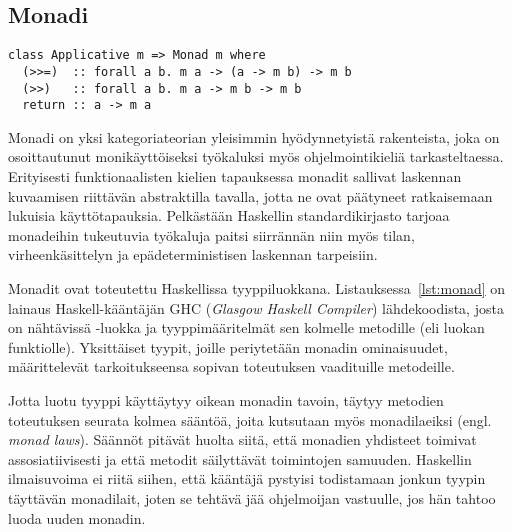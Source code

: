 \documentclass[finnish]{tktltiki2}
\begin{document}



\subsection{Monadi}

\begin{lstlisting}[float,float,label={lst:monad},caption={Monad-tyyppiluokka}]
class Applicative m => Monad m where
  (>>=)  :: forall a b. m a -> (a -> m b) -> m b
  (>>)   :: forall a b. m a -> m b -> m b
  return :: a -> m a
\end{lstlisting}

Monadi on yksi kategoriateorian yleisimmin hyödynnetyistä rakenteista, joka on osoittautunut
monikäyttöiseksi työkaluksi myös ohjelmointikieliä tarkasteltaessa. Erityisesti funktionaalisten
kielien tapauksessa monadit sallivat laskennan kuvaamisen riittävän abstraktilla tavalla, jotta ne
ovat päätyneet ratkaisemaan lukuisia käyttötapauksia. Pelkästään Haskellin standardikirjasto tarjoaa
monadeihin tukeutuvia työkaluja paitsi siirrännän niin myös tilan, virheenkäsittelyn ja
epädeterministisen laskennan tarpeisiin.

Monadit ovat toteutettu Haskellissa tyyppiluokkana. Listauksessa~\ref{lst:monad} on lainaus
Haskell-kääntäjän GHC (\emph{Glasgow Haskell Compiler}) lähdekoodista, josta on nähtävissä
-luokka ja tyyppimääritelmät sen kolmelle metodille (eli luokan funktiolle). Yksittäiset
tyypit, joille periytetään monadin ominaisuudet, määrittelevät tarkoitukseensa sopivan toteutuksen
vaadituille metodeille.

Jotta luotu tyyppi käyttäytyy oikean monadin tavoin, täytyy metodien toteutuksen seurata kolmea
sääntöä, joita kutsutaan myös monadilaeiksi (engl. \emph{monad laws}). Säännöt pitävät huolta siitä,
että monadien yhdisteet toimivat assosiatiivisesti ja että metodit säilyttävät toimintojen samuuden.
Haskellin ilmaisuvoima ei riitä siihen, että kääntäjä pystyisi todistamaan jonkun tyypin täyttävän
monadilait, joten se tehtävä jää ohjelmoijan vastuulle, jos hän tahtoo luoda uuden monadin.
\end{document}

